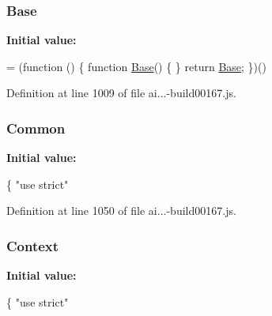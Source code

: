 \subsubsection[{\texorpdfstring{Base}{Base}}]{ Base}\hypertarget{_scripts_2ai_80_822_89-build00167_8js_abc90faad356138d0991872b4e65ecf20}{}\label{_scripts_2ai_80_822_89-build00167_8js_abc90faad356138d0991872b4e65ecf20}
{\bfseries Initial value\+:}
\begin{DoxyCode}
= (\textcolor{keyword}{function} () \{
            \textcolor{keyword}{function} \hyperlink{obj_2_release_2_package_2_package_tmp_2_scripts_2ai_80_822_89-build00167_8js_abc90faad356138d0991872b4e65ecf20}{Base}() \{
            \}
            \textcolor{keywordflow}{return} \hyperlink{obj_2_release_2_package_2_package_tmp_2_scripts_2ai_80_822_89-build00167_8js_abc90faad356138d0991872b4e65ecf20}{Base};
        \})()
\end{DoxyCode}


Definition at line 1009 of file ai...-\/build00167.\+js.

\subsubsection[{\texorpdfstring{Common}{Common}}]{\setlength{\rightskip}{0pt plus 5cm}Common}\hypertarget{_scripts_2ai_80_822_89-build00167_8js_a2898ea5b5bdc6f6ebd68c36327a6cecd}{}\label{_scripts_2ai_80_822_89-build00167_8js_a2898ea5b5bdc6f6ebd68c36327a6cecd}
{\bfseries Initial value\+:}
\begin{DoxyCode}
\{
                \textcolor{stringliteral}{"use strict"}
\end{DoxyCode}


Definition at line 1050 of file ai...-\/build00167.\+js.

\subsubsection[{\texorpdfstring{Context}{Context}}]{\setlength{\rightskip}{0pt plus 5cm}Context}\hypertarget{_scripts_2ai_80_822_89-build00167_8js_abbebfae2c8b3c06e3115e79965277840}{}\label{_scripts_2ai_80_822_89-build00167_8js_abbebfae2c8b3c06e3115e79965277840}
{\bfseries Initial value\+:}
\begin{DoxyCode}
\{
            \textcolor{stringliteral}{"use strict"}
\end{DoxyCode}


